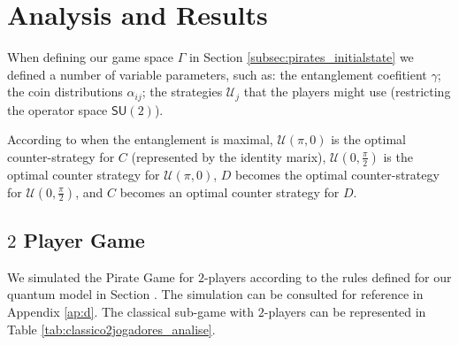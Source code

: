 \section{Analysis and Results}
\label{sec:description_3}

When defining our game space $\Gamma$ in Section \ref{subsec:pirates_initialstate} we defined a number of variable parameters, such as: the entanglement coefitient $\gamma$; the coin distributions $\alpha_{ij}$; the strategies $\mathcal{U}_{j}$ that the players might use (restricting the operator space $\mathsf{SU}(2)$). 

According to \cite{Du} when the entanglement is maximal, $\mathcal{U}(\pi, 0)$ is the optimal counter-strategy for $C$ (represented by the identity marix), $\mathcal{U}(0, \frac{\pi}{2})$ is the optimal counter strategy for $\mathcal{U}(\pi, 0)$, $D$ becomes the optimal counter-strategy for $\mathcal{U}(0, \frac{\pi}{2})$, and $C$ becomes an optimal counter strategy for $D$.

\subsection{$2$ Player Game}
\label{subsec:2playergame}

We simulated the Pirate Game for $2$-players according to the rules defined for our quantum model in Section . The simulation can be consulted for reference in Appendix \ref{ap:d}. The classical sub-game with $2$-players can be represented in Table \ref{tab:classico2jogadores_analise}.

